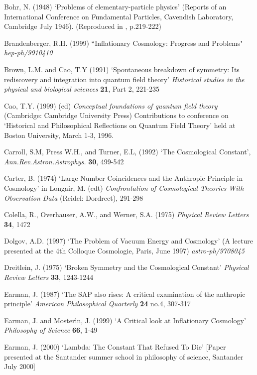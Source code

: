 \documentclass[12pt]{article}
\begin{document}
\begin{thebibliography}{X}
 Bohr, N. (1948) `Problems of elementary-particle
physics' (Reports of an International Conference on Fundamental Particles,
Cavendish Laboratory, Cambridge July 1946). (Reproduced in 
\cite{kalckar96}, p.219-222)

 Brandenberger, R.H. (1999) ``Inflationary
Cosmology: Progress and Problems" {\em hep-ph/9910410}

Brown, L.M. and Cao, T.Y (1991) `Spontaneous breakdown of symmetry: Its
rediscovery and integration into quantum field theory'
{\em Historical studies in the physical and biological sciences}
{\bf 21}, Part 2, 221-235

Cao, T.Y. (1999) (ed) {\em Conceptual foundations of quantum field
theory} (Cambridge: Cambridge University Press) Contributions to
conference on `Historical and Philosophical Reflections on Quantum 
Field Theory' held at Boston University, March 1-3, 1996. 

Carroll, S.M, Press W.H., and Turner, E.L,
(1992) `The Cosmological Constant',
{\em Ann.Rev.Astron.Astrophys.}
{\bf 30}, 499-542 

Carter, B. (1974) `Large Number Coincidences and the Anthropic Principle
in Cosmology' in Longair, M. (edt) {\em Confrontation of Cosmological
Theories With Observation Data} (Reidel: Dordrect), 291-298

 Colella, R., Overhauser, A.W., and Werner, S.A.
(1975) {\em Physical Review Letters}  {\bf 34}, 1472

Dolgov, A.D. (1997) `The Problem of Vacuum Energy and Cosmology'
(A lecture presented at the 4th Colloque Cosmologie, Paris, June
1997)  {\em astro-ph/9708045}

Dreitlein, J. (1975) `Broken Symmetry and the Cosmological Constant'
{\em Physical Review Letters} {\bf 33}, 1243-1244

 Earman, J. (1987)
`The SAP also rises: A critical examination of the anthropic
principle' {\em American Philosophical Quarterly} {\bf 24} no.4,
 307-317

Earman, J. and Moster\'\i n, J. (1999) `A Critical look at
Inflationary Cosmology' {\em Philosophy of Science} {\bf 66}, 1-49

 Earman, J. (2000) `Lambda: The Constant That Refused To Die'
[Paper presented at the Santander summer school in philosophy of science,
Santander July 2000]


\end{thebibliography}
\end{document}
